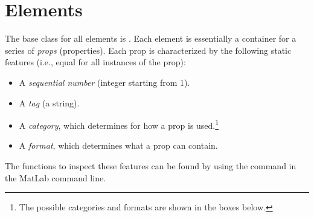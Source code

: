 \documentclass{tufte-handout}
\begin{document}
\section{Elements}

The base class for all elements is . 
Each element is essentially a container for a series of \emph{props} (properties). Each prop is characterized by the following static features (i.e., equal for all instances of the prop):
\begin{itemize}

\item A \emph{sequential number} (integer starting from 1).
		
\item A \emph{tag} (a string).
	
\item A \emph{category}, which determines for how a prop is used.\footnote{The possible categories and formats are shown in the boxes below.}
	
\item A \emph{format}, which determines what a prop can contain.

\end{itemize}
The functions to inspect these features can be found by using the command  in the MatLab command line.
\end{document}
